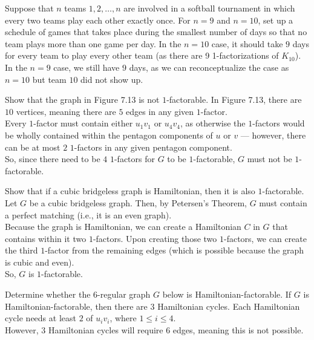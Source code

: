 \documentclass[8pt]{extarticle}
\title{}
\author{Avinash Iyer}
\date{}
\begin{document}
  \begin{problem}{12}
    Suppose that $n$ teams $1,2,\dots,n$ are involved in a softball tournament in which every two teams play each other exactly once. For $n=9$ and $n=10$, set up a schedule of games that takes place during the smallest number of days so that no team plays more than one game per day.
    \tcblower
    In the $n=10$ case, it should take $9$ days for every team to play every other team (as there are 9 1-factorizations of $K_{10}$).\\

    In the $n=9$ case, we still have $9$ days, as we can reconceptualize the case as $n=10$ but team $10$ did not show up.
  \end{problem}
  \begin{problem}{13}
    Show that the graph in Figure 7.13 is not $1$-factorable.
    \tcblower
    In Figure 7.13, there are $10$ vertices, meaning there are $5$ edges in any given $1$-factor.\\

    Every $1$-factor must contain either $u_1v_1$ or $u_4v_4$, as otherwise the $1$-factors would be wholly contained within the pentagon components of $u$ or $v$ --- however, there can be at most $2$ $1$-factors in any given pentagon component.\\

    So, since there need to be $4$ $1$-factors for $G$ to be $1$-factorable, $G$ must not be $1$-factorable.
  \end{problem}
  \begin{problem}{14}
    Show that if a cubic bridgeless graph is Hamiltonian, then it is also $1$-factorable.
    \tcblower
    Let $G$ be a cubic bridgeless graph. Then, by Petersen's Theorem, $G$ must contain a perfect matching (i.e., it is an even graph).\\

    Because the graph is Hamiltonian, we can create a Hamiltonian $C$ in $G$ that contains within it two $1$-factors. Upon creating those two $1$-factors, we can create the third $1$-factor from the remaining edges (which is possible because the graph is cubic and even).\\

    So, $G$ is $1$-factorable.
  \end{problem}
  \begin{problem}{15}
    Determine whether the $6$-regular graph $G$ below is Hamiltonian-factorable.
    \tcblower
    If $G$ is Hamiltonian-factorable, then there are $3$ Hamiltonian cycles. Each Hamiltonian cycle needs at least $2$ of $u_iv_i$, where $1\leq i\leq 4$.\\

    However, $3$ Hamiltonian cycles will require $6$ edges, meaning this is not possible.
  \end{problem}
\end{document}
